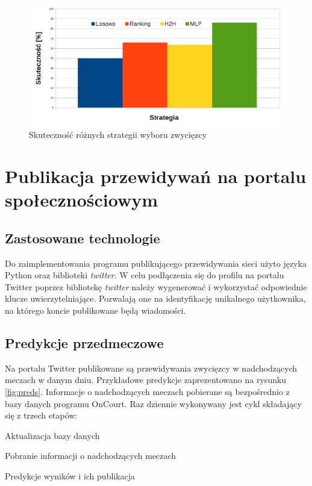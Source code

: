 \begin{figure}[H]
\includegraphics[width=\textwidth]{scores.png}
\caption{Skuteczność różnych strategii wyboru zwycięzcy}
\label{fig:scores}
\end{figure}



\chapter{Publikacja przewidywań na portalu społecznościowym}

\section{Zastosowane technologie}
\label{Sec:BotTech}

Do zaimplementowania programu publikującego przewidywania sieci użyto języka Python oraz biblioteki \textit{twitter}. W celu podłączenia się do profilu na portalu Twitter poprzez bibliotekę \textit{twitter} należy wygenerować i wykorzystać odpowiednie klucze uwierzytelniające. Pozwalają one na identyfikację unikalnego użytkownika, na którego koncie publikowane będą wiadomości.

\section{Predykcje przedmeczowe}
\label{Sec:PredykcjePrzed}
Na portalu Twitter publikowane są przewidywania zwycięzcy w nadchodzących meczach w danym dniu. Przykładowe predykcje zaprezentowano na rysunku \ref{fig:preds}. Informacje o nadchodzących meczach pobierane są bezpośrednio z bazy danych programu OnCourt. Raz dziennie wykonywany jest cykl składający się z trzech etapów:
\begin{tightitemize}
\item Aktualizacja bazy danych
\item Pobranie informacji o nadchodzących meczach
\item Predykcje wyników i ich publikacja
\end{tightitemize}

